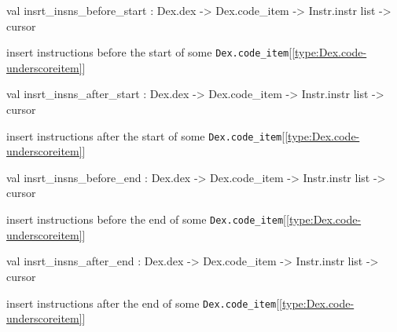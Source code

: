 \documentclass[11pt]{article}
\begin{document}
\label{val:Modify.insrt-underscoreinsns-underscorebefore-underscorestart}\begin{ocamldoccode}
val insrt_insns_before_start :
  Dex.dex -> Dex.code_item -> Instr.instr list -> cursor
\end{ocamldoccode}
\begin{ocamldocdescription}
insert instructions before the start of some {\tt{Dex.code\_item}}[\ref{type:Dex.code-underscoreitem}]


\end{ocamldocdescription}




\label{val:Modify.insrt-underscoreinsns-underscoreafter-underscorestart}\begin{ocamldoccode}
val insrt_insns_after_start :
  Dex.dex -> Dex.code_item -> Instr.instr list -> cursor
\end{ocamldoccode}
\begin{ocamldocdescription}
insert instructions after the start of some {\tt{Dex.code\_item}}[\ref{type:Dex.code-underscoreitem}]


\end{ocamldocdescription}




\label{val:Modify.insrt-underscoreinsns-underscorebefore-underscoreend}\begin{ocamldoccode}
val insrt_insns_before_end :
  Dex.dex -> Dex.code_item -> Instr.instr list -> cursor
\end{ocamldoccode}
\begin{ocamldocdescription}
insert instructions before the end of some {\tt{Dex.code\_item}}[\ref{type:Dex.code-underscoreitem}]


\end{ocamldocdescription}




\label{val:Modify.insrt-underscoreinsns-underscoreafter-underscoreend}\begin{ocamldoccode}
val insrt_insns_after_end :
  Dex.dex -> Dex.code_item -> Instr.instr list -> cursor
\end{ocamldoccode}
\begin{ocamldocdescription}
insert instructions after the end of some {\tt{Dex.code\_item}}[\ref{type:Dex.code-underscoreitem}]


\end{ocamldocdescription}
\end{document}
